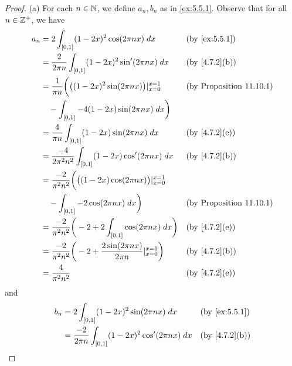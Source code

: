\begin{proof}{(a)}
  For each \(n \in \mathbb{N}\), we define \(a_n, b_n\) as in \cref{ex:5.5.1}.
  Observe that for all \(n \in \mathbb{Z}^+\), we have
  \begin{align*}
    a_n & = 2 \int_{[0, 1]} (1 - 2x)^2 \cos(2 \pi n x) \; dx                                           &  & \text{(by \cref{ex:5.5.1})}     \\
        & = \dfrac{2}{2 \pi n} \int_{[0, 1]} (1 - 2x)^2 \sin'(2 \pi n x) \; dx                         &  & \text{(by \cref{4.7.2}(b))}     \\
        & = \dfrac{1}{\pi n} \bigg(\big((1 - 2x)^2 \sin(2 \pi n x)\big)|_{x = 0}^{x = 1}               &  & \text{(by Proposition 11.10.1)} \\
        & \quad - \int_{[0, 1]} -4 (1 - 2x) \sin(2 \pi n x) \; dx\bigg)                                                                     \\
        & = \dfrac{4}{\pi n} \int_{[0, 1]} (1 - 2x) \sin(2 \pi n x) \; dx                              &  & \text{(by \cref{4.7.2}(e))}     \\
        & = \dfrac{-4}{2 \pi^2 n^2} \int_{[0, 1]} (1 - 2x) \cos'(2 \pi n x) \; dx                      &  & \text{(by \cref{4.7.2}(b))}     \\
        & = \dfrac{-2}{\pi^2 n^2} \bigg(\big((1 - 2x) \cos(2 \pi n x)\big)|_{x = 0}^{x = 1}                                                 \\
        & \quad - \int_{[0, 1]} -2 \cos(2 \pi n x) \; dx\bigg)                                         &  & \text{(by Proposition 11.10.1)} \\
        & = \dfrac{-2}{\pi^2 n^2} \bigg(-2 + 2 \int_{[0, 1]} \cos(2 \pi n x) \; dx\bigg)               &  & \text{(by \cref{4.7.2}(e))}     \\
        & = \dfrac{-2}{\pi^2 n^2} \bigg(-2 + \dfrac{2 \sin(2 \pi n x)}{2 \pi n}|_{x = 0}^{x = 1}\bigg) &  & \text{(by \cref{4.7.2}(b))}     \\
        & = \dfrac{4}{\pi^2 n^2}                                                                       &  & \text{(by \cref{4.7.2}(e))}
  \end{align*}
  and
  \begin{align*}
    b_n & = 2 \int_{[0, 1]} (1 - 2x)^2 \sin(2 \pi n x) \; dx                                &  & \text{(by \cref{ex:5.5.1})}     \\
        & = \dfrac{-2}{2 \pi n} \int_{[0, 1]} (1 - 2x)^2 \cos'(2 \pi n x) \; dx             &  & \text{(by \cref{4.7.2}(b))}     \\

\end{align*}
\end{proof}
